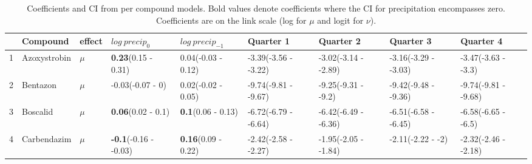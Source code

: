 \begingroup\fontsize{8pt}{10pt}\selectfont
\begin{longtable}{lp{2cm}p{0.6cm}p{1.8cm}p{1.8cm}p{1.8cm}p{1.8cm}p{1.8cm}p{1.8cm}}
\caption[Coefficients and CI from per compound models.]{Coefficients and CI from per compound models. 
                     Bold values denote coefficients where the CI for precipitation encompasses zero.
                     Coefficients are on the link scale (log for $\mu$ and logit for $\nu$).} \\ 
  \toprule
 & Compound & effect & $log~precip_0$ & $log~precip_{-1}$ & Quarter 1 & Quarter 2 & Quarter 3 & Quarter 4 \\ 
  \midrule
1 & Azoxystrobin & $\mu$ & \textbf{0.23}\newline (0.15 - 0.31) & 0.04\newline (-0.03 - 0.12) & -3.39\newline (-3.56 - -3.22) & -3.02\newline (-3.14 - -2.89) & -3.16\newline (-3.29 - -3.03) & -3.47\newline (-3.63 - -3.3) \\ 
  2 & Bentazon & $\mu$ & -0.03\newline (-0.07 - 0) & 0.02\newline (-0.02 - 0.05) & -9.74\newline (-9.81 - -9.67) & -9.25\newline (-9.31 - -9.2) & -9.42\newline (-9.48 - -9.36) & -9.74\newline (-9.81 - -9.68) \\ 
  3 & Boscalid & $\mu$ & \textbf{0.06}\newline (0.02 - 0.1) & \textbf{0.1}\newline (0.06 - 0.13) & -6.72\newline (-6.79 - -6.64) & -6.42\newline (-6.49 - -6.36) & -6.51\newline (-6.58 - -6.45) & -6.58\newline (-6.65 - -6.5) \\ 
  4 & Carbendazim & $\mu$ & \textbf{-0.1}\newline (-0.16 - -0.03) & \textbf{0.16}\newline (0.09 - 0.22) & -2.42\newline (-2.58 - -2.27) & -1.95\newline (-2.05 - -1.84) & -2.11\newline (-2.22 - -2) & -2.32\newline (-2.46 - -2.18) \\ 

\end{longtable}

